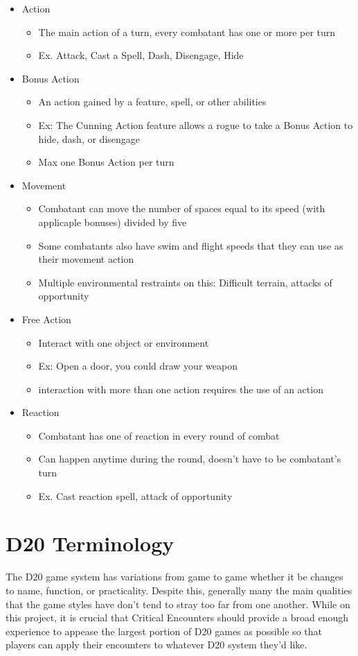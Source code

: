\documentclass[12pt,a4paper]{report}
\begin{document}
	\begin{itemize}
		\item Action
			\begin{itemize}
				\item The main action of a turn, every combatant has one or more per turn
				\item Ex. Attack, Cast a Spell, Dash, Disengage, Hide
			\end{itemize}
		\item Bonus Action
			\begin{itemize}
				\item An action gained by a feature, spell, or other abilities
				\item Ex: The Cunning Action feature allows a rogue to take a Bonus Action to hide, dash, or disengage
				\item Max one Bonus Action per turn
			\end{itemize}
		\item Movement
			\begin{itemize}
				\item Combatant can move the number of spaces equal to its speed (with applicaple bonuses) divided by five
				\item Some combatants also have swim and flight speeds that they can use as their movement action
				\item Multiple environmental restraints on this: Difficult terrain, attacks of opportunity
			\end{itemize}
		\item Free Action
			\begin{itemize}
				\item Interact with one object or environment 
				\item Ex: Open a door, you could draw your weapon
				\item interaction with more than one action requires the use of an action
			\end{itemize}
		\item Reaction
			\begin{itemize}
				\item Combatant has one of reaction in every round of combat
				\item Can happen anytime during the round, doesn't have to be combatant's turn
				\item Ex. Cast reaction spell, attack of opportunity
			\end{itemize}
	\end{itemize}
	\section{D20 Terminology}
		The D20 game system has variations from game to game whether it be changes to name, function, or practicality. Despite this, generally many the main qualities that the game styles have don't tend to stray too far from one another. While on this project, it is crucial that Critical Encounters should provide a broad enough experience to appease the largest portion of D20 games as possible so that players can apply their encounters to whatever D20 system they'd like. 
\end{document}
